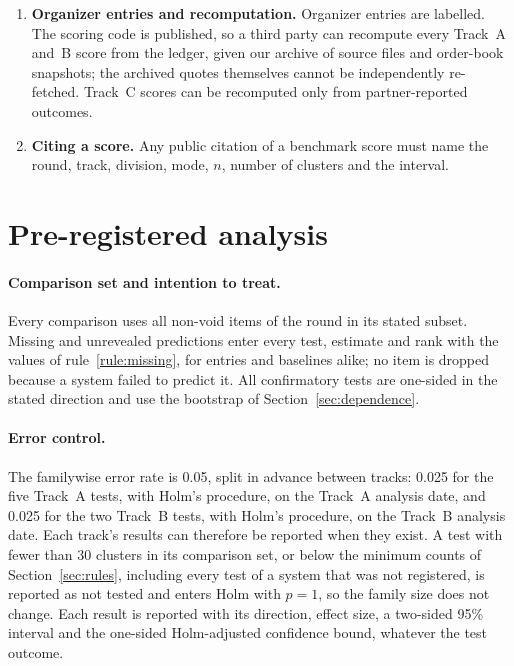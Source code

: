 \documentclass[11pt]{article}
\begin{document}
\begin{enumerate}
  \item \textbf{Organizer entries and recomputation.} Organizer entries are labelled. The scoring code is published, so a third party can recompute every Track~A and~B score from the ledger, given our archive of source files and order-book snapshots; the archived quotes themselves cannot be independently re-fetched. Track~C scores can be recomputed only from partner-reported outcomes.
  \item \textbf{Citing a score.} Any public citation of a benchmark score must name the round, track, division, mode, $n$, number of clusters and the interval.
\end{enumerate}

\section{Pre-registered analysis}
\label{sec:analysis}

\paragraph{Comparison set and intention to treat.} Every comparison uses all non-void items of the round in its stated subset. Missing and unrevealed predictions enter every test, estimate and rank with the values of rule~\ref{rule:missing}, for entries and baselines alike; no item is dropped because a system failed to predict it. All confirmatory tests are one-sided in the stated direction and use the bootstrap of Section~\ref{sec:dependence}.

\paragraph{Error control.} The familywise error rate is 0.05, split in advance between tracks: 0.025 for the five Track~A tests, with Holm's procedure, on the Track~A analysis date, and 0.025 for the two Track~B tests, with Holm's procedure, on the Track~B analysis date. Each track's results can therefore be reported when they exist. A test with fewer than 30 clusters in its comparison set, or below the minimum counts of Section~\ref{sec:rules}, including every test of a system that was not registered, is reported as not tested and enters Holm with $p = 1$, so the family size does not change. Each result is reported with its direction, effect size, a two-sided 95\% interval and the one-sided Holm-adjusted confidence bound, whatever the test outcome.
\end{document}
